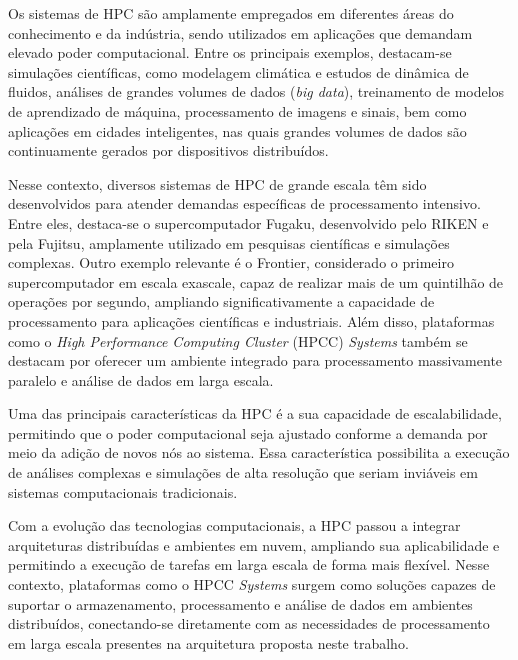 Os sistemas de HPC são amplamente empregados em diferentes áreas do conhecimento e da indústria, sendo utilizados em aplicações que demandam elevado poder computacional. Entre os principais exemplos, destacam-se simulações científicas, como modelagem climática e estudos de dinâmica de fluidos, análises de grandes volumes de dados (\textit{big data}), treinamento de modelos de aprendizado de máquina, processamento de imagens e sinais, bem como aplicações em cidades inteligentes, nas quais grandes volumes de dados são continuamente gerados por dispositivos distribuídos.

Nesse contexto, diversos sistemas de HPC de grande escala têm sido desenvolvidos para atender demandas específicas de processamento intensivo. Entre eles, destaca-se o supercomputador Fugaku, desenvolvido pelo RIKEN e pela Fujitsu, amplamente utilizado em pesquisas científicas e simulações complexas. Outro exemplo relevante é o Frontier, considerado o primeiro supercomputador em escala exascale, capaz de realizar mais de um quintilhão de operações por segundo, ampliando significativamente a capacidade de processamento para aplicações científicas e industriais. Além disso, plataformas como o \textit{High Performance Computing Cluster} (\gls{HPCC}) \textit{Systems} também se destacam por oferecer um ambiente integrado para processamento massivamente paralelo e análise de dados em larga escala.

Uma das principais características da HPC é a sua capacidade de escalabilidade, permitindo que o poder computacional seja ajustado conforme a demanda por meio da adição de novos nós ao sistema. Essa característica possibilita a execução de análises complexas e simulações de alta resolução que seriam inviáveis em sistemas computacionais tradicionais.

Com a evolução das tecnologias computacionais, a HPC passou a integrar arquiteturas distribuídas e ambientes em nuvem, ampliando sua aplicabilidade e permitindo a execução de tarefas em larga escala de forma mais flexível. Nesse contexto, plataformas como o \gls{HPCC} \textit{Systems} surgem como soluções capazes de suportar o armazenamento, processamento e análise de dados em ambientes distribuídos, conectando-se diretamente com as necessidades de processamento em larga escala presentes na arquitetura proposta neste trabalho.
